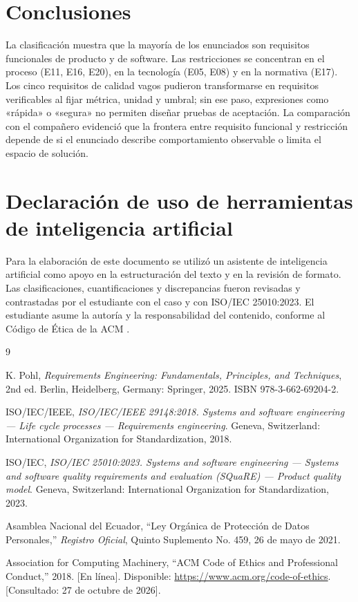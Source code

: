 \documentclass[11pt,a4paper]{article}
\begin{document}
\section{Conclusiones}

La clasificación muestra que la mayoría de los enunciados son requisitos funcionales de producto y de software. Las restricciones se concentran en el proceso (E11, E16, E20), en la tecnología (E05, E08) y en la normativa (E17). Los cinco requisitos de calidad vagos pudieron transformarse en requisitos verificables al fijar métrica, unidad y umbral; sin ese paso, expresiones como «rápida» o «segura» no permiten diseñar pruebas de aceptación. La comparación con el compañero evidenció que la frontera entre requisito funcional y restricción depende de si el enunciado describe comportamiento observable o limita el espacio de solución.

\section{Declaración de uso de herramientas de inteligencia artificial}

Para la elaboración de este documento se utilizó un asistente de inteligencia artificial como apoyo en la estructuración del texto y en la revisión de formato. Las clasificaciones, cuantificaciones y discrepancias fueron revisadas y contrastadas por el estudiante con el caso y con ISO/IEC 25010:2023. El estudiante asume la autoría y la responsabilidad del contenido, conforme al Código de Ética de la ACM \cite{acm}.

\begin{thebibliography}{9}

 K. Pohl, \emph{Requirements Engineering: Fundamentals, Principles, and Techniques}, 2nd ed. Berlin, Heidelberg, Germany: Springer, 2025. ISBN 978-3-662-69204-2.

 ISO/IEC/IEEE, \emph{ISO/IEC/IEEE 29148:2018. Systems and software engineering --- Life cycle processes --- Requirements engineering}. Geneva, Switzerland: International Organization for Standardization, 2018.

 ISO/IEC, \emph{ISO/IEC 25010:2023. Systems and software engineering --- Systems and software quality requirements and evaluation (SQuaRE) --- Product quality model}. Geneva, Switzerland: International Organization for Standardization, 2023.

 Asamblea Nacional del Ecuador, ``Ley Orgánica de Protección de Datos Personales,'' \emph{Registro Oficial}, Quinto Suplemento No. 459, 26 de mayo de 2021.

 Association for Computing Machinery, ``ACM Code of Ethics and Professional Conduct,'' 2018. [En línea]. Disponible: \url{https://www.acm.org/code-of-ethics}. [Consultado: 27 de octubre de 2026].

\end{thebibliography}
\end{document}
